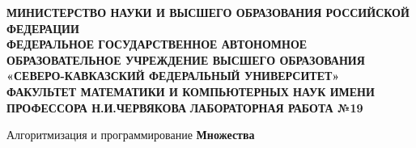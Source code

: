 \documentclass[14pt,a4paper]{article}
\newenvironment{fancyblock}
{\large\bfseries\scshape}
{}
\begin{document}
\begin{titlepage}
  \begin{center}
    \begin{fancyblock}
      МИНИСТЕРСТВО НАУКИ И ВЫСШЕГО ОБРАЗОВАНИЯ РОССИЙСКОЙ ФЕДЕРАЦИИ\\
      ФЕДЕРАЛЬНОЕ ГОСУДАРСТВЕННОЕ АВТОНОМНОЕ ОБРАЗОВАТЕЛЬНОЕ УЧРЕЖДЕНИЕ ВЫСШЕГО
      ОБРАЗОВАНИЯ\\
      «СЕВЕРО-КАВКАЗСКИЙ ФЕДЕРАЛЬНЫЙ УНИВЕРСИТЕТ»\\
      ФАКУЛЬТЕТ МАТЕМАТИКИ И КОМПЬЮТЕРНЫХ НАУК ИМЕНИ ПРОФЕССОРА Н.И.ЧЕРВЯКОВА}
      \vfill
      \Large{\textbf{ЛАБОРАТОРНАЯ РАБОТА №19}}\\[2mm]
      \begin{large}
        Алгоритмизация и программирование
        \textbf{Множества}
      \end{large}
    \end{fancyblock}
  \end{center}
\end{titlepage}
\end{document}
